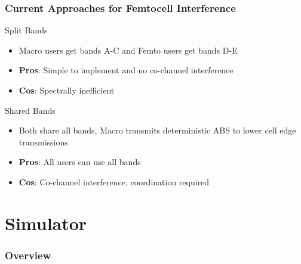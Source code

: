 \documentclass{beamer}
\begin{document}

\begin{frame}
\frametitle{Current Approaches for Femtocell Interference}
\begin{block}{Split Bands}
\begin{itemize}
  \item Macro users get bands A-C and Femto users get bands D-E
  \item \textbf{Pros}: Simple to implement and no co-channel interference
  \item \textbf{Cos}: Spectrally inefficient
\end{itemize}
\end{block}
\begin{block}{Shared Bands}
\begin{itemize}
  \item Both share all bands, Macro transmits deterministic ABS to lower cell edge transmissions
  \item \textbf{Pros}: All users can use all bands
  \item \textbf{Cos}: Co-channel interference, coordination required
\end{itemize}
\end{block}

\end{frame}

\section{Simulator}

\begin{frame}
  \frametitle{Overview} %
  \tableofcontents %
\end{frame}

\end{document}
